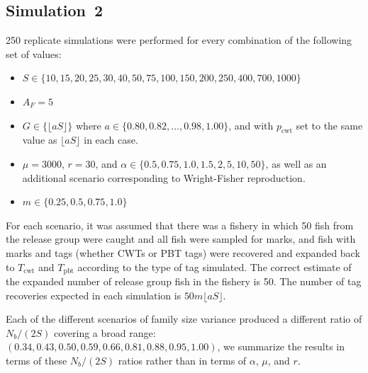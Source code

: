 \documentclass[11pt]{article}
\begin{document}
\subsection{Simulation~2}
250 replicate simulations were performed for every combination of the following set of values:
\begin{itemize}
\item $S \in \{10, 15, 20, 25, 30, 40, 50, 75, 100, 150, 200, 250, 400, 700, 1000\}$
\item $A_F = 5$
\item $G \in \{\lfloor a S\rfloor\}$ where $a \in \{0.80, 0.82, \ldots, 0.98, 1.00\}$, and with $p_\mathrm{cwt}$ set to the same
value as $\lfloor a S\rfloor$ in each case.
\item $\mu = 3000$, $r = 30$, and $\alpha \in \{0.5, 0.75, 1.0, 1.5, 2, 5, 10, 50\}$, as well as an additional scenario corresponding to
Wright-Fisher reproduction. 
\item $m \in \{0.25, 0.5, 0.75, 1.0\}$
\end{itemize}
For each scenario, it was assumed that there was a fishery in which 50 fish from the release group were caught and all fish
were sampled for marks, and fish with marks and tags (whether CWTs or PBT tags) were recovered and expanded back to
$T_\mathrm{cwt}$ and $T_\mathrm{pbt}$ according to the type of tag simulated.  The correct estimate of the expanded 
number of release group fish in the fishery is 50.  The number of tag recoveries expected in each simulation is
$50 m \lfloor a S \rfloor$.

Each of the different scenarios of family size variance produced a different ratio of $N_b/(2S)$ covering a broad range:
$(0.34, 0.43, 0.50, 0.59, 0.66, 0.81, 0.88, 0.95, 1.00)$, we summarize the results in terms of these $N_b/(2S)$ ratios
rather than in terms of $\alpha$, $\mu$, and $r$.
\end{document}
